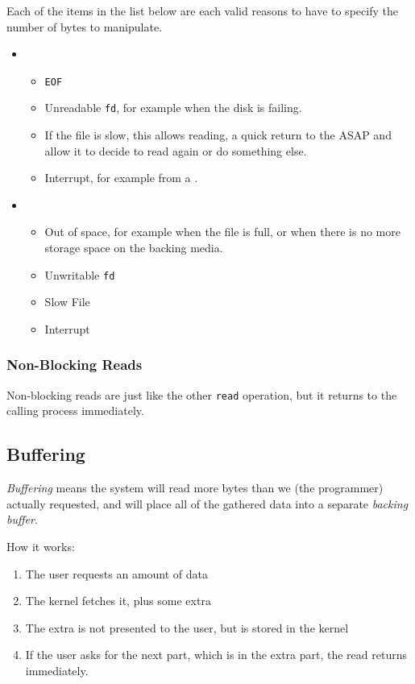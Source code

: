 Each of the items in the list below are each valid reasons to have to specify the number of bytes to manipulate.
\begin{itemize}[noitemsep]
\item {}
  \begin{itemize}[noitemsep]
  \item \texttt{EOF}
  \item Unreadable \texttt{fd}, for example when the disk is failing.
  \item If the file is slow, this allows reading, a quick return to the  ASAP and allow it to decide to read again or do something else.
  \item Interrupt, for example from a .
  \end{itemize}
\item {}
  \begin{itemize}[noitemsep]
  \item Out of space, for example when the file is full, or when there is no more storage space on the backing media.
  \item Unwritable \texttt{fd}
  \item Slow File
  \item Interrupt
  \end{itemize}
\end{itemize}

\subsubsection{Non-Blocking Reads}\label{subsubsec:Non-Blocking_Reads}
Non-blocking reads are just like the other \texttt{read} operation, but it returns to the calling process immediately.

\subsection{Buffering}\label{subsec:Buffering}
\begin{definition}[Buffering]\label{def:Buffering}
  \emph{Buffering} means the system will read more bytes than we (the programmer) actually requested, and will place all of the gathered data into a separate \emph{backing buffer}.
\end{definition}

How it works:
\begin{enumerate}[noitemsep]
\item The user requests an amount of data
\item The kernel fetches it, plus some extra
\item The extra is not presented to the user, but is stored in the kernel
\item If the user asks for the next part, which is in the extra part, the read returns immediately.
\end{enumerate}

